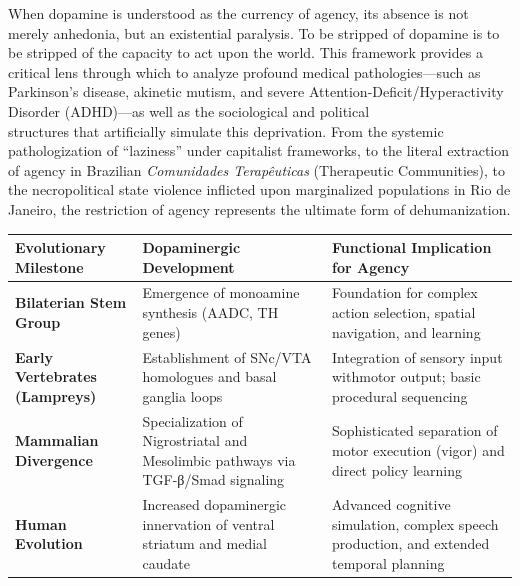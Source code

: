 When dopamine is understood as the currency of agency, its absence is not merely anhedonia, but an existential paralysis. To be stripped of dopamine is to be stripped of the capacity to act upon the world. This framework provides a critical lens through which to analyze profound medical pathologies---such as Parkinson's disease, akinetic mutism, and severe Attention-Deficit/Hyperactivity Disorder (ADHD)---as well as the sociological and political\\
structures that artificially simulate this deprivation. From the systemic pathologization of ``laziness'' under capitalist frameworks, to the literal extraction of agency in Brazilian \emph{Comunidades Terapêuticas} (Therapeutic Communities), to the necropolitical state violence inflicted upon marginalized populations in Rio de Janeiro, the restriction of agency represents the ultimate form of dehumanization.

{\def\LTcaptype{none} %
\begin{longtable}[]{@{}
  >{\raggedright\arraybackslash}p{}
  >{\raggedright\arraybackslash}p{}
  >{\raggedright\arraybackslash}p{}@{}}
\toprule\noalign{}
\begin{minipage}[b]{\linewidth}\raggedright
Evolutionary Milestone
\end{minipage} & \begin{minipage}[b]{\linewidth}\raggedright
Dopaminergic Development
\end{minipage} & \begin{minipage}[b]{\linewidth}\raggedright
Functional Implication for Agency
\end{minipage} \\
\midrule\noalign{}
\endhead
\bottomrule\noalign{}
\endlastfoot
\textbf{Bilaterian Stem Group} & Emergence of monoamine synthesis (AADC, TH genes) & Foundation for complex action selection, spatial navigation, and learning \\
\textbf{Early Vertebrates (Lampreys)} & Establishment of SNc/VTA homologues and basal ganglia loops & Integration of sensory input withmotor output; basic procedural sequencing \\
\textbf{Mammalian Divergence} & Specialization of Nigrostriatal and Mesolimbic pathways via TGF-β/Smad signaling & Sophisticated separation of motor execution (vigor) and direct policy learning \\
\textbf{Human Evolution} & Increased dopaminergic innervation of ventral striatum and medial caudate & Advanced cognitive simulation, complex speech production, and extended temporal planning \\
\end{longtable}
}

